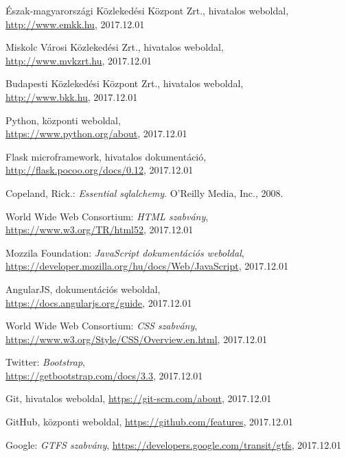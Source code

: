 \begin{thebibliography}{x}

Észak-magyarországi Közlekedési Központ Zrt.,
hivatalos weboldal, \\
\url{http://www.emkk.hu}, 2017.12.01

Miskolc Városi Közlekedési Zrt., hivatalos weboldal,\\
\url{http://www.mvkzrt.hu}, 2017.12.01

Budapesti Közlekedési Központ Zrt., hivatalos weboldal, \\
\url{http://www.bkk.hu}, 2017.12.01

Python, központi weboldal, \\
\url{https://www.python.org/about}, 2017.12.01

Flask microframework, hivatalos dokumentáció, \\
\url{http://flask.pocoo.org/docs/0.12}, 2017.12.01

Copeland, Rick.: \emph{Essential sqlalchemy}.  O'Reilly Media, Inc., 2008.

World Wide Web Consortium: \emph{HTML szabvány}, \\ \url{https://www.w3.org/TR/html52}, 2017.12.01

Mozzila Foundation: \emph{JavaScript dokumentációs weboldal}, \\
\url{https://developer.mozilla.org/hu/docs/Web/JavaScript}, 2017.12.01

AngularJS, dokumentációs weboldal, \\
\url{https://docs.angularjs.org/guide}, 2017.12.01

World Wide Web Consortium: \emph{CSS szabvány}, \\ \url{https://www.w3.org/Style/CSS/Overview.en.html}, 2017.12.01

Twitter: \emph{Bootstrap}, \\
\url{https://getbootstrap.com/docs/3.3}, 2017.12.01

Git, hivatalos weboldal, \url{https://git-scm.com/about}, 2017.12.01

GitHub, központi weboldal, \url{https://github.com/features}, 2017.12.01

Google: \emph{GTFS szabvány}, \url{https://developers.google.com/transit/gtfs}, 2017.12.01


\end{thebibliography}
